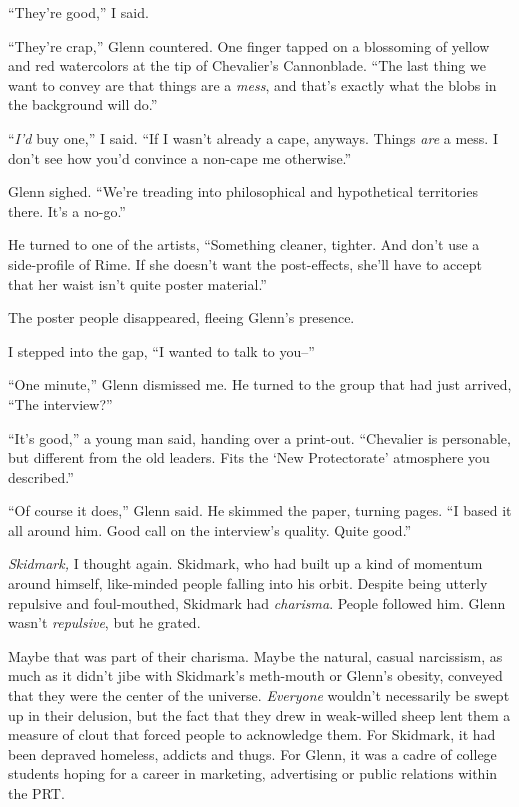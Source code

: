 ``They're good,'' I said.



``They're crap,'' Glenn countered.  One finger tapped on a blossoming of yellow and red watercolors at the tip of Chevalier's Cannonblade.  ``The last thing we want to convey are that things are a \emph{mess}, and that's exactly what the blobs in the background will do.''



``\emph{I'd} buy one,'' I said.  ``If I wasn't already a cape, anyways.  Things \emph{are} a mess.  I don't see how you'd convince a non-cape me otherwise.''



Glenn sighed.  ``We're treading into philosophical and hypothetical territories there.  It's a no-go.''



He turned to one of the artists,  ``Something cleaner, tighter.  And don't use a side-profile of Rime.  If she doesn't want the post-effects, she'll have to accept that her waist isn't quite poster material.''



The poster people disappeared, fleeing Glenn's presence.



I stepped into the gap, ``I wanted to talk to you--''



``One minute,'' Glenn dismissed me.  He turned to the group that had just arrived, ``The interview?''



``It's good,'' a young man said, handing over a print-out.  ``Chevalier is personable, but different from the old leaders.  Fits the `New Protectorate' atmosphere you described.''



``Of course it does,'' Glenn said.  He skimmed the paper, turning pages.  ``I based it all around him.  Good call on the interview's quality.  Quite good.''



\emph{Skidmark, } I thought again.  Skidmark, who had built up a kind of momentum around himself, like-minded people falling into his orbit.  Despite being utterly repulsive and foul-mouthed, Skidmark had \emph{charisma}.  People followed him.  Glenn wasn't \emph{repulsive}, but he grated.



Maybe that was part of their charisma.  Maybe the natural, casual narcissism, as much as it didn't jibe with Skidmark's meth-mouth or Glenn's obesity, conveyed that they were the center of the universe.  \emph{Everyone} wouldn't necessarily be swept up in their delusion, but the fact that they drew in weak-willed sheep lent them a measure of clout that forced people to acknowledge them.  For Skidmark, it had been depraved homeless, addicts and thugs.  For Glenn, it was a cadre of college students hoping for a career in marketing, advertising or public relations within the PRT.



